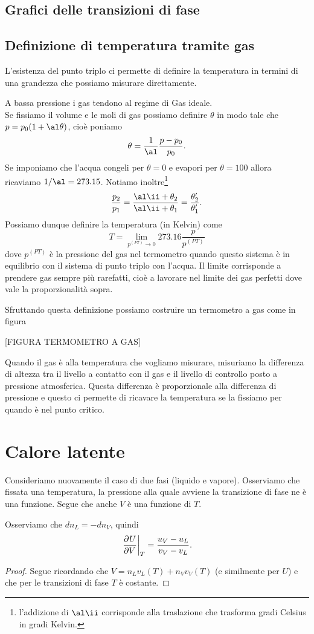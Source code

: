 \subsection{Grafici delle transizioni di fase}
\noindent
[GRAFICO $p,V$]


\noindent
[GRAFICO $p,T$]



\subsection{Definizione di temperatura tramite gas}
L'esistenza del punto triplo ci permette di definire la temperatura in termini di una grandezza che possiamo misurare direttamente. 
\medskip

\noindent
A bassa pressione i gas tendono al regime di Gas ideale.\\
Se fissiamo il volume e le moli di gas possiamo definire $\theta$ in modo tale che $p=p_0(1+\al\theta)$, cio\`e poniamo 
\[\theta=\frac1\al\frac{p-p_0}{p_0}.\] 
Se imponiamo che l'acqua congeli per $\theta=0$ e evapori per $\theta=100$ allora ricaviamo $1/\al=273.15$. Notiamo inoltre\footnote{l'addizione di $\al\ii$ corrisponde alla traslazione che trasforma gradi Celsius in gradi Kelvin.}
\[\frac{p_2}{p_1}=\frac{\al\ii+\theta_2}{\al\ii +\theta_1}=\frac{\theta_2'}{\theta_1'}.\]
Possiamo dunque definire la temperatura (in Kelvin) come
\[T=\lim_{p^{(PT)}\to 0}273.16 \frac{p}{p^{(PT)}}\]
dove $p^{(PT)}$ \`e la pressione del gas nel termometro quando questo sistema \`e in equilibrio con il sistema di punto triplo con l'acqua. Il limite corrisponde a prendere gas sempre pi\`u rarefatti, cio\`e a lavorare nel limite dei gas perfetti dove vale la proporzionalit\`a sopra.
\medskip

\noindent Sfruttando questa definizione possiamo costruire un termometro a gas come in figura

[FIGURA TERMOMETRO A GAS]

\noindent Quando il gas \`e alla temperatura che vogliamo misurare, misuriamo la differenza di altezza tra il livello a contatto con il gas e il livello di controllo posto a pressione atmosferica. 
Questa differenza \`e proporzionale alla differenza di pressione e questo ci permette di ricavare la temperatura se la fissiamo per quando \`e nel punto critico.




\section{Calore latente}
Consideriamo nuovamente il caso di due fasi (liquido e vapore). Osserviamo che fissata una temperatura, la pressione alla quale avviene la transizione di fase ne \`e una funzione. Segue che anche $V$ \`e una funzione di $T$.
\begin{remark}
Osserviamo che $dn_L=-dn_V$, quindi
\[\ppb VUT=\frac{u_V-u_L}{v_V-v_L}.\]
\end{remark}
\begin{proof}
Segue ricordando che $V=n_L v_L(T)+n_Vv_V(T)$ (e similmente per $U$) e che per le transizioni di fase $T$ \`e costante.
\end{proof}

